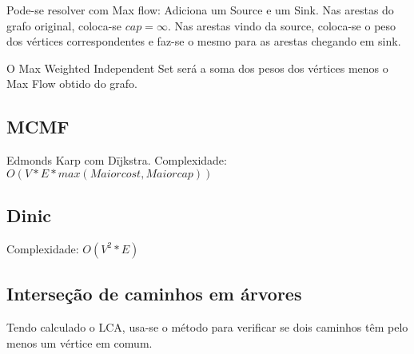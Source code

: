 Pode-se resolver com Max flow: Adiciona um Source e um Sink. Nas arestas do grafo original, coloca-se $cap=\infty$. Nas arestas vindo da source, coloca-se o peso dos v\'{e}rtices correspondentes e faz-se o mesmo para as arestas chegando em sink.

O Max Weighted Independent Set ser\'{a} a soma dos pesos dos v\'{e}rtices menos o Max Flow obtido do grafo.
\divisor

\subsection{MCMF}
Edmonds Karp com D\"{i}jkstra. Complexidade: $O(V*E*max(Maior cost,Maior cap))$
\divisor

\subsection{Dinic}
Complexidade: $O(V^2*E)$
\divisor

\subsection{Interse\c{c}\~{a}o de caminhos em \'{a}rvores}
Tendo calculado o LCA, usa-se o m\'{e}todo para verificar se dois caminhos t\^{e}m pelo menos um v\'{e}rtice em comum.
\divisor
